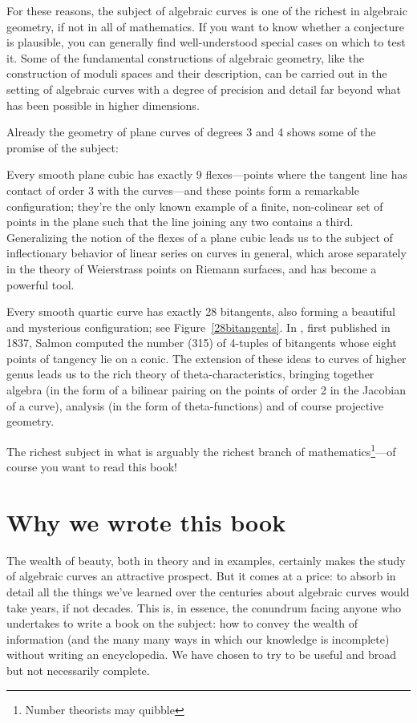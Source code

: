 For these reasons, the subject of algebraic curves is one of the richest in algebraic geometry, if not in all of mathematics. If you want to know whether a conjecture is plausible, you can generally find well-understood special cases on which to test it. Some of the fundamental constructions of algebraic geometry, like the construction of moduli spaces and their description, can be carried out in the setting of algebraic curves with a degree of precision and detail far beyond what has been possible in higher dimensions. 

Already the geometry of plane curves of degrees 3 and 4 shows some of the promise of the subject:

Every smooth plane cubic has exactly 9 flexes---points where the tangent line has contact of order 3 with the curves---and these points form a remarkable configuration; they're the only known example of a finite, non-colinear set of points in the plane such that the line joining any two contains a third. Generalizing the notion of the flexes of a plane cubic leads us to the subject of inflectionary behavior of linear series on curves in general, which arose separately in the theory of Weierstrass points on Riemann surfaces, and  has become a powerful tool. 


Every smooth quartic curve has exactly 28 bitangents, also forming a beautiful and mysterious configuration; see
Figure~\ref{28bitangents}. In \cite{MR0115124}, first published in 1837, Salmon computed the number (315) of 4-tuples of bitangents whose eight points of tangency lie on a conic. The extension of these ideas to curves of higher genus leads us to the rich theory of theta-characteristics, bringing together algebra (in the form of a bilinear pairing on the points of order 2 in the Jacobian of a curve), analysis (in the form of theta-functions) and of course projective geometry.

The richest subject in what is arguably the richest branch of mathematics\footnote{Number theorists may quibble}---of course you want to read this book! 

\section{Why we wrote this book}

The wealth of beauty, both in theory and in examples, certainly makes the study of algebraic curves an attractive prospect. But it comes at a price: to absorb in detail all the things we've learned over the centuries about algebraic curves would take years, if not decades. This is, in essence, the conundrum facing anyone who undertakes to write a book on the subject: how to convey the wealth of information  (and the many many ways in which our knowledge is incomplete) without writing an encyclopedia. We have chosen to try to be useful and broad but not necessarily complete. 

